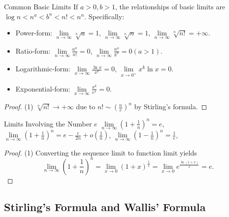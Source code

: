 \begin{proposition}{Common Basic Limits}{}
  If $a > 0, b > 1$, the relationships of basic limits are
  $\log n < n^a < b^n < n! < n^n$. Specifically:
  \begin{itemize}
  \item Power-form: $\lim \limits _{n \rightarrow \infty} \sqrt[n]{a} = 1$,
    $\lim \limits _{n \rightarrow \infty} \sqrt[n]{n} = 1$,
    $\lim \limits _{n \rightarrow \infty} \sqrt[n]{n!} = +\infty$.
  \item Ratio-form: $\lim \limits _{n \rightarrow \infty} \frac{a^n}{n!} = 0$,
    $\lim \limits _{n \rightarrow \infty} \frac{n^a}{b^n} = 0 (a > 1)$.
  \item Logarithmic-form: $\lim \limits _{x \rightarrow \infty} \frac{\ln
      x}{x^k} = 0$,
    $\lim \limits _{x \rightarrow 0^+} x^k \ln x = 0$.
  \item Exponential-form: $\lim \limits _{x \rightarrow \infty} \frac{x^k}{e^x}
    = 0$.
  \end{itemize}
\end{proposition}

\begin{proof}
  (1) $\sqrt[n]{n!} \rightarrow +\infty$ due to $n! \sim \left( \frac{n}{e}
  \right)^n$ by Stirling's formula.
\end{proof}

\begin{proposition}{Limits Involving the Number $e$}{}
  $\lim \limits _{n \rightarrow \infty} \left(1 + \frac{1}{n}\right)^n = e$,
  $\lim \limits _{n \rightarrow \infty} (1 + \frac{1}{n})^n = e - \frac{e}{2n} +
  o(\frac{1}{n})$,
  $\lim \limits _{n \rightarrow \infty} \left( 1 - \frac{1}{n} \right)^n = \frac{1}{e}$,
\end{proposition}

\begin{proof}
  (1) Converting the sequence limit to function limit yields
  \begin{equation}
    \lim \limits _{n \rightarrow \infty} \left( 1 + \frac{1}{n} \right)^n
    = \lim \limits _{x \rightarrow 0} (1 + x)^{\frac{1}{x}}
    = \lim \limits _{x \rightarrow 0} e^{\frac{\ln (1 + x)}{x}} = e.
  \end{equation}
\end{proof}

\subsection{Stirling's Formula and Wallis' Formula}


